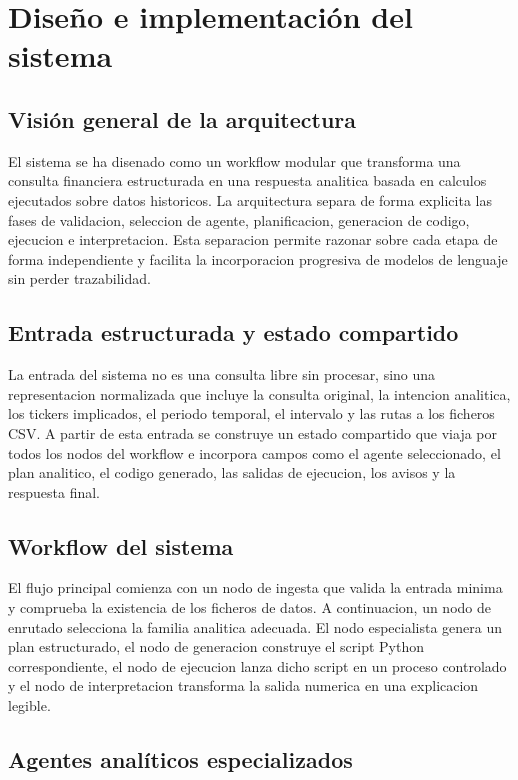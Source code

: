 \chapter{Dise\~no e implementaci\'on del sistema}

\section{Visi\'on general de la arquitectura}

El sistema se ha disenado como un workflow modular que transforma una consulta financiera estructurada en una respuesta analitica basada en calculos ejecutados sobre datos historicos. La arquitectura separa de forma explicita las fases de validacion, seleccion de agente, planificacion, generacion de codigo, ejecucion e interpretacion. Esta separacion permite razonar sobre cada etapa de forma independiente y facilita la incorporacion progresiva de modelos de lenguaje sin perder trazabilidad.

\section{Entrada estructurada y estado compartido}

La entrada del sistema no es una consulta libre sin procesar, sino una representacion normalizada que incluye la consulta original, la intencion analitica, los tickers implicados, el periodo temporal, el intervalo y las rutas a los ficheros CSV. A partir de esta entrada se construye un estado compartido que viaja por todos los nodos del workflow e incorpora campos como el agente seleccionado, el plan analitico, el codigo generado, las salidas de ejecucion, los avisos y la respuesta final.

\section{Workflow del sistema}

El flujo principal comienza con un nodo de ingesta que valida la entrada minima y comprueba la existencia de los ficheros de datos. A continuacion, un nodo de enrutado selecciona la familia analitica adecuada. El nodo especialista genera un plan estructurado, el nodo de generacion construye el script Python correspondiente, el nodo de ejecucion lanza dicho script en un proceso controlado y el nodo de interpretacion transforma la salida numerica en una explicacion legible.

\section{Agentes anal\'iticos especializados}

